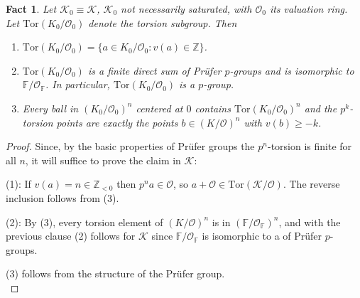 \documentclass[11pt]{amsart}
\DeclareMathOperator{\acl}{acl}
\newtheorem{fact}[theorem]{Fact}
\theoremstyle{definition}
\newcommand{\CK}{{\mathcal K}}
\newcommand{\CO}{{\mathcal O}}
\newcommand{\0}{\emptyset}
\def\sub{\subseteq}
\begin{document}
\begin{fact}\label{F: torsion}
Let $\CK_0\equiv \CK$, $\CK_0$ not necessarily saturated, with $\CO_0$ its valuation ring. Let $\mathrm{Tor}(K_0/\CO_0)$ denote the torsion subgroup. Then
\begin{enumerate}
    \item  $\mathrm{Tor}(K_0/\CO_0)=\{a\in K_0/\CO_0:v(a)\in \mathbb{Z}\}$.
    \item $\mathrm{Tor}(K_0/\CO_0)$ is a finite direct sum of Pr\"ufer $p$-groups and is isomorphic to $\mathbb{F}/\CO_{\mathbb{F}}$. In particular, $\mathrm{Tor}(K_0/\CO_0)$ is a $p$-group. 
    \item Every ball in $(K_0/\CO_0)^n$ centered at $0$ contains $\mathrm{Tor}(K_0/\CO_0)^n$ and the $p^k$-torsion points are 
    exactly the points $b\in (K/\CO)^n$ with $v(b)\geq -k$.

\end{enumerate}
\end{fact}
\begin{proof}
Since, by the basic properties of Pr\"ufer groups the $p^n$-torsion is finite for all $n$, it will suffice to prove the claim in $\CK$: 

(1): If  $v(a)=n\in \mathbb Z_{<0}$ then $p^n a\in \CO$, so $a+\CO\in \mathrm{Tor}(\CK/\CO)$. The reverse inclusion follows from \cite[Lemma 3.1]{HaHaPeGps}(3).

 (2):
By \cite[Lemma 3.1]{HaHaPeGps}(3), every torsion element of $(K/\CO)^n$ is in $(\mathbb F/\CO_{\mathbb F})^n$, and with the previous clause (2) follows for $\CK$ since $\mathbb F/\CO_\mathbb F$ is isomorphic to a  of Pr\"ufer $p$-groups.

(3) follows from the structure of the Pr\"ufer group. \\


\end{proof}
\end{document}
